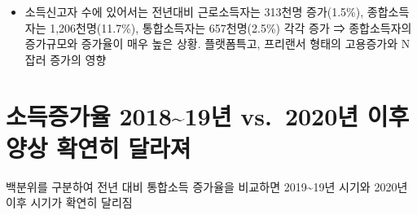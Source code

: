 \documentclass[
  a4paper,
  oneside,
  open=any]{scrbook}
\providecommand{\tightlist}{%
  \setlength{\itemsep}{0pt}\setlength{\parskip}{0pt}}\usepackage{longtable,booktabs,array}
\begin{document}
\begin{itemize}
\tightlist
\item
  소득신고자 수에 있어서는 전년대비 근로소득자는 313천명 증가(1.5\%),
  종합소득자는 1,206천명(11.7\%), 통합소득자는 657천명(2.5\%) 각각 증가
  ⇒ 종합소득자의 증가규모와 증가율이 매우 높은 상황. 플랫폼특고,
  프리랜서 형태의 고용증가와 N잡러 증가의 영향
\end{itemize}

\section{소득증가율 2018\textasciitilde19년 vs.~2020년 이후 양상 확연히
달라져}\label{uxc18cuxb4dduxc99duxac00uxc728-201819uxb144-vs.-2020uxb144-uxc774uxd6c4-uxc591uxc0c1-uxd655uxc5f0uxd788-uxb2ecuxb77cuxc838}

백분위를 구분하여 전년 대비 통합소득 증가율을 비교하면
2019\textasciitilde19년 시기와 2020년 이후 시기가 확연히 달리짐
\end{document}
